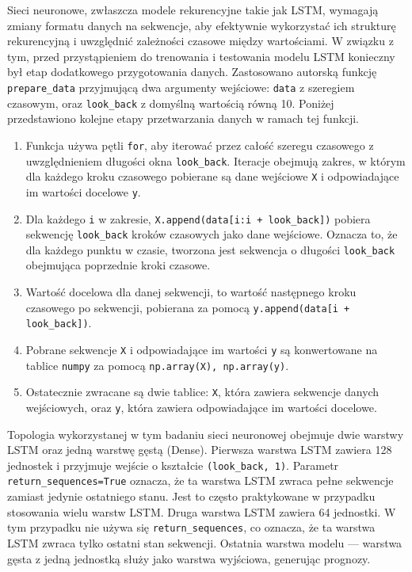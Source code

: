\documentclass[polish, twoside, 12pt, a4paper]{article}
\theoremstyle{definition}
\theoremstyle{plain}
\theoremstyle{remark}
\newcommand{\code}[1]{\lstinline{#1}}
\begin{document}
Sieci neuronowe, zwłaszcza modele rekurencyjne takie jak LSTM, wymagają zmiany formatu danych na sekwencje, aby efektywnie wykorzystać ich strukturę rekurencyjną i uwzględnić zależności czasowe między wartościami. W związku z tym, przed przystąpieniem do trenowania i testowania modelu LSTM konieczny był etap dodatkowego przygotowania danych. Zastosowano autorską funkcję \code{prepare_data} przyjmującą dwa argumenty wejściowe: \code{data} z szeregiem czasowym, oraz \code{look_back} z domyślną wartością równą 10. Poniżej przedstawiono kolejne etapy przetwarzania danych w ramach tej funkcji.
\begin{enumerate}[label=\arabic*.,noitemsep]
	\item Funkcja używa pętli \code{for}, aby iterować przez całość szeregu czasowego z uwzględnieniem długości okna \code{look_back}. Iteracje obejmują zakres, w którym dla każdego kroku czasowego pobierane są dane wejściowe \code{X} i odpowiadające im wartości docelowe \code{y}.
	\item Dla każdego \code{i} w zakresie, \code{X.append(data[i:i + look_back])} pobiera sekwencję \code{look_back} kroków czasowych jako dane wejściowe. Oznacza to, że dla każdego punktu w czasie, tworzona jest sekwencja o długości \code{look_back} obejmująca poprzednie kroki czasowe.
	\item Wartość docelowa dla danej sekwencji, to wartość następnego kroku czasowego po sekwencji, pobierana za pomocą \code{y.append(data[i + look_back])}.
	\item Pobrane sekwencje \code{X} i odpowiadające im wartości \code{y} są konwertowane na tablice \code{numpy} za pomocą \code{np.array(X), np.array(y)}.
	\item Ostatecznie zwracane są dwie tablice: \code{X}, która zawiera sekwencje danych wejściowych, oraz \code{y}, która zawiera odpowiadające im wartości docelowe.
\end{enumerate}


Topologia wykorzystanej w tym badaniu sieci neuronowej obejmuje dwie warstwy LSTM oraz jedną warstwę gęstą (Dense). Pierwsza warstwa LSTM zawiera 128 jednostek i przyjmuje wejście o kształcie \code{(look_back, 1)}. Parametr \code{return_sequences=True} oznacza, że ta warstwa LSTM zwraca pełne sekwencje zamiast jedynie ostatniego stanu. Jest to często praktykowane w przypadku stosowania wielu warstw LSTM. Druga warstwa LSTM zawiera 64 jednostki. W tym przypadku nie używa się \code{return_sequences}, co oznacza, że ta warstwa LSTM zwraca tylko ostatni stan sekwencji. Ostatnia warstwa modelu --- warstwa gęsta z jedną jednostką służy jako warstwa wyjściowa, generując prognozy.
\end{document}
